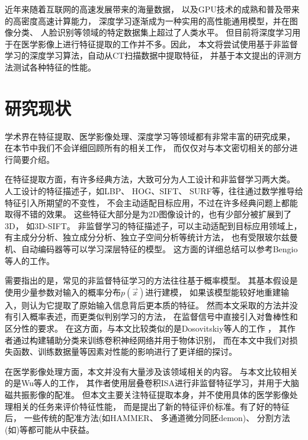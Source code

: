 近年来随着互联网的高速发展带来的海量数据，
以及GPU技术的成熟和普及带来的高密度高速计算能力，
深度学习逐渐成为一种实用的高性能通用模型，并在图像分类\cite{he2015delving}、
人脸识别\cite{schroff2015facenet}等领域的特定数据集上超过了人类水平。
但目前将深度学习用于在医学影像上进行特征提取的工作并不多。因此，
本文将尝试使用基于非监督学习的深度学习算法，自动从CT扫描数据中提取特征，
并基于本文提出的评测方法测试各种特征的性能。

\section{研究现状}
学术界在特征提取、医学影像处理、深度学习等领域都有非常丰富的研究成果，
在本节中我们不会详细回顾所有的相关工作，
而仅仅对与本文密切相关的部分进行简要介绍。

在特征提取方面，有许多经典方法，大致可分为人工设计和非监督学习两大类。
人工设计的特征描述子，如LBP\cite{ojala1994performance}、
HOG\cite{dalal2005histograms}、SIFT\cite{lowe1999object}、
SURF\cite{bay2006surf}等，往往通过数学推导给特征引入所期望的不变性，
不会主动适配目标应用，不过在许多经典问题上都能取得不错的效果。
这些特征大部分是为2D图像设计的，也有少部分被扩展到了3D，
如3D-SIFT\cite{scovanner20073}。
非监督学习的特征描述子，可以主动适配到目标应用领域上，
有主成分分析、独立成分分析、独立子空间分析等统计方法，
也有受限玻尔兹曼机、自动编码器等可以学习深层特征的模型。
这方面的详细总结可以参考Bengio等人的工作\cite{bengio2013representation}。

需要指出的是，常见的非监督特征学习的方法往往基于概率模型。
其基本假设是使用少量参数对输入的概率分布$p(\vec{x})$进行建模，
如果该模型能较好地重建输入，则认为它提取了原始输入信息背后更本质的特征。
然而本文采取的方法并没有引入概率表述，而更类似判别学习的方法，
在监督信号中直接引入对鲁棒性和区分性的要求。
在这方面，与本文比较类似的是Dosovitskiy等人的工作
\cite{dosovitskiy2014discriminative}，
其作者通过构建辅助分类来训练卷积神经网络并用于物体识别，
而在本文中我们对损失函数、训练数据量等因素对性能的影响进行了更详细的探讨。

在医学影像处理方面，本文并没有大量涉及该领域相关的内容。
与本文比较相关的是Wu等人的工作\cite{wu2013unsupervised}，
其作者使用层叠卷积ISA进行非监督特征学习，并用于大脑磁共振影像的配准。
但本文主要关注特征提取本身，并不使用具体的医学影像处理相关的任务来评价特征性能，
而是提出了新的特征评价标准。有了好的特征后，
一些传统的配准方法(如HAMMER\cite{shen2002hammer}、
多通道微分同胚demon\cite{peyrat2010registration})、
分割方法(如\cite{ling2008hierarchical})等都可能从中获益。

